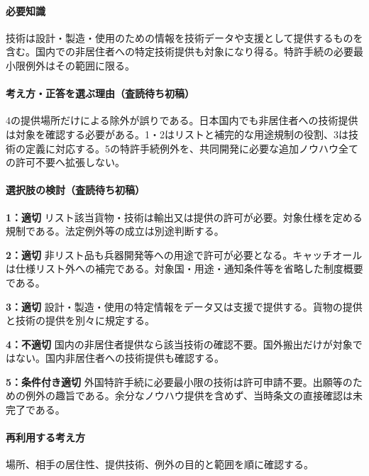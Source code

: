 \paragraph{必要知識} 技術は設計・製造・使用のための情報を技術データや支援として提供するものを含む。国内での非居住者への特定技術提供も対象になり得る。特許手続の必要最小限例外はその範囲に限る。

\paragraph{考え方・正答を選ぶ理由（査読待ち初稿）} 4の提供場所だけによる除外が誤りである。日本国内でも非居住者への技術提供は対象を確認する必要がある。1・2はリストと補完的な用途規制の役割、3は技術の定義に対応する。5の特許手続例外を、共同開発に必要な追加ノウハウ全ての許可不要へ拡張しない。

\paragraph{選択肢の検討（査読待ち初稿）}\mbox{}\par

\noindent\textbf{1：適切} リスト該当貨物・技術は輸出又は提供の許可が必要。対象仕様を定める規制である。法定例外等の成立は別途判断する。\par

\noindent\textbf{2：適切} 非リスト品も兵器開発等への用途で許可が必要となる。キャッチオールは仕様リスト外への補完である。対象国・用途・通知条件等を省略した制度概要である。\par

\noindent\textbf{3：適切} 設計・製造・使用の特定情報をデータ又は支援で提供する。貨物の提供と技術の提供を別々に規定する。\par

\noindent\textbf{4：不適切} 国内の非居住者提供なら該当技術の確認不要。国外搬出だけが対象ではない。国内非居住者への技術提供も確認する。\par

\noindent\textbf{5：条件付き適切} 外国特許手続に必要最小限の技術は許可申請不要。出願等のための例外の趣旨である。余分なノウハウ提供を含めず、当時条文の直接確認は未完了である。\par

\paragraph{再利用する考え方} 場所、相手の居住性、提供技術、例外の目的と範囲を順に確認する。

